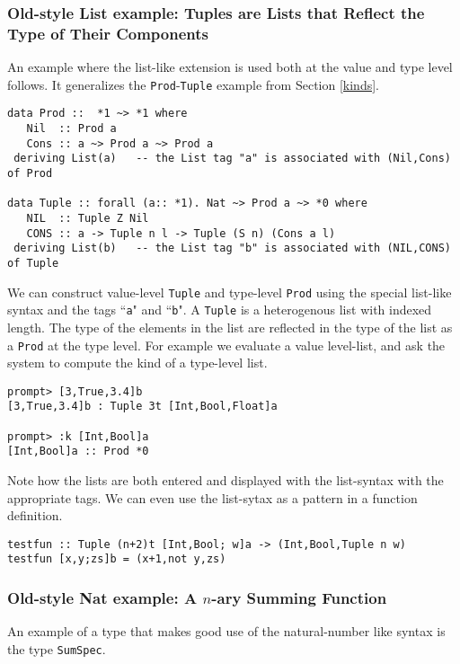 \documentclass[11pt,twoside]{article}
\begin{document}
\subsubsection{Old-style List example: Tuples are Lists that Reflect the Type of Their Components}

An example where the
list-like extension is used both at the value and type level follows.
It generalizes the {\tt Prod}-{\tt Tuple} example from Section \ref{kinds}.



\begin{verbatim}
data Prod ::  *1 ~> *1 where
   Nil  :: Prod a
   Cons :: a ~> Prod a ~> Prod a
 deriving List(a)   -- the List tag "a" is associated with (Nil,Cons) of Prod

data Tuple :: forall (a:: *1). Nat ~> Prod a ~> *0 where
   NIL  :: Tuple Z Nil
   CONS :: a -> Tuple n l -> Tuple (S n) (Cons a l)
 deriving List(b)   -- the List tag "b" is associated with (NIL,CONS) of Tuple
\end{verbatim} 
We can construct value-level {\tt Tuple} and type-level {\tt Prod} using
the special list-like syntax and the tags ``{\tt a}" and ``{\tt b}". A {\tt Tuple}
is a heterogenous list with indexed length. The type of the elements in
the list are reflected in the type of the list as a {\tt Prod} at the type
level. For example we evaluate a value level-list, and ask the system
to compute the kind of a type-level list.

\begin{verbatim}
prompt> [3,True,3.4]b
[3,True,3.4]b : Tuple 3t [Int,Bool,Float]a

prompt> :k [Int,Bool]a
[Int,Bool]a :: Prod *0 
\end{verbatim} 

Note how the lists are both entered and displayed with
the list-syntax with the appropriate tags. We can even use the list-sytax
as a pattern in a function definition.

\begin{verbatim}
testfun :: Tuple (n+2)t [Int,Bool; w]a -> (Int,Bool,Tuple n w)
testfun [x,y;zs]b = (x+1,not y,zs) 
\end{verbatim} 

\subsubsection{Old-style Nat example: A $n$-ary Summing Function}

An example of a type that makes good
use of the natural-number like syntax is the type {\tt SumSpec}.
\end{document}
